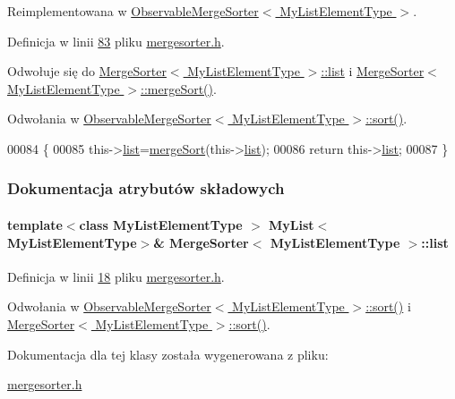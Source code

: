 Reimplementowana w \hyperlink{class_observable_merge_sorter_ac845eed6758733f3935ffb5aa0b5f64a}{Observable\-Merge\-Sorter$<$ My\-List\-Element\-Type $>$}.



Definicja w linii \hyperlink{mergesorter_8h_source_l00083}{83} pliku \hyperlink{mergesorter_8h_source}{mergesorter.\-h}.



Odwołuje się do \hyperlink{mergesorter_8h_source_l00018}{Merge\-Sorter$<$ My\-List\-Element\-Type $>$\-::list} i \hyperlink{mergesorter_8h_source_l00063}{Merge\-Sorter$<$ My\-List\-Element\-Type $>$\-::merge\-Sort()}.



Odwołania w \hyperlink{observablemergesorter_8h_source_l00023}{Observable\-Merge\-Sorter$<$ My\-List\-Element\-Type $>$\-::sort()}.


\begin{DoxyCode}
00084         \{
00085                 this->\hyperlink{class_merge_sorter_a8ac3ee938414809d7da627cf918f1f87}{list}=\hyperlink{class_merge_sorter_ab945fd9934a6f47a851b40b23d18ee71}{mergeSort}(this->\hyperlink{class_merge_sorter_a8ac3ee938414809d7da627cf918f1f87}{list});
00086                 \textcolor{keywordflow}{return} this->\hyperlink{class_merge_sorter_a8ac3ee938414809d7da627cf918f1f87}{list};
00087         \}
\end{DoxyCode}


\subsubsection{Dokumentacja atrybutów składowych}
\hypertarget{class_merge_sorter_a8ac3ee938414809d7da627cf918f1f87}{
\paragraph[{list}]{\setlength{\rightskip}{0pt plus 5cm}template$<$class My\-List\-Element\-Type $>$ {\bf My\-List}$<$My\-List\-Element\-Type$>$\& {\bf Merge\-Sorter}$<$ My\-List\-Element\-Type $>$\-::list}}\label{class_merge_sorter_a8ac3ee938414809d7da627cf918f1f87}


Definicja w linii \hyperlink{mergesorter_8h_source_l00018}{18} pliku \hyperlink{mergesorter_8h_source}{mergesorter.\-h}.



Odwołania w \hyperlink{observablemergesorter_8h_source_l00023}{Observable\-Merge\-Sorter$<$ My\-List\-Element\-Type $>$\-::sort()} i \hyperlink{mergesorter_8h_source_l00083}{Merge\-Sorter$<$ My\-List\-Element\-Type $>$\-::sort()}.



Dokumentacja dla tej klasy została wygenerowana z pliku\-:\begin{DoxyCompactItemize}
\item 
\hyperlink{mergesorter_8h}{mergesorter.\-h}\end{DoxyCompactItemize}
